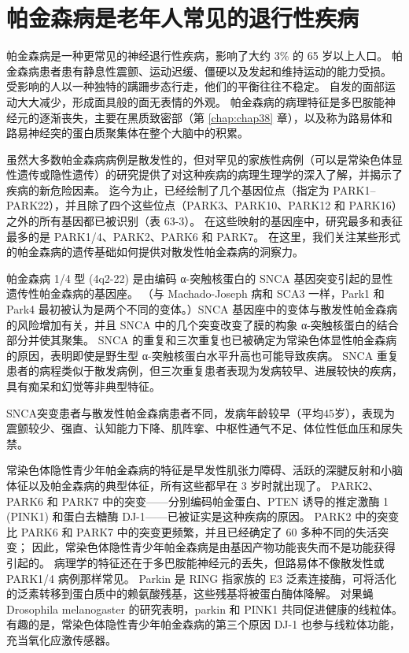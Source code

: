 \section{帕金森病是老年人常见的退行性疾病}

帕金森病是一种更常见的神经退行性疾病，影响了大约 3\% 的 65 岁以上人口。 帕金森病患者患有静息性震颤、运动迟缓、僵硬以及发起和维持运动的能力受损。 受影响的人以一种独特的蹒跚步态行走，他们的平衡往往不稳定。 自发的面部运动大大减少，形成面具般的面无表情的外观。 帕金森病的病理特征是多巴胺能神经元的逐渐丧失，主要在黑质致密部（第 \ref{chap:chap38} 章），以及称为路易体和路易神经突的蛋白质聚集体在整个大脑中的积累。

虽然大多数帕金森病病例是散发性的，但对罕见的家族性病例（可以是常染色体显性遗传或隐性遗传）的研究提供了对这种疾病的病理生理学的深入了解，并揭示了疾病的新危险因素。 迄今为止，已经绘制了几个基因位点（指定为 PARK1–PARK22），并且除了四个这些位点（PARK3、PARK10、PARK12 和 PARK16）之外的所有基因都已被识别（表 63-3）。 在这些映射的基因座中，研究最多和表征最多的是 PARK1/4、PARK2、PARK6 和 PARK7。 在这里，我们关注某些形式的帕金森病的遗传基础如何提供对散发性帕金森病的洞察力。

帕金森病 1/4 型 (4q2-22) 是由编码 α-突触核蛋白的 SNCA 基因突变引起的显性遗传性帕金森病的基因座。 （与 Machado-Joseph 病和 SCA3 一样，Park1 和 Park4 最初被认为是两个不同的变体。）SNCA 基因座中的变体与散发性帕金森病的风险增加有关，并且 SNCA 中的几个突变改变了膜的构象 α-突触核蛋白的结合部分并使其聚集。 SNCA 的重复和三次重复也已被确定为常染色体显性帕金森病的原因，表明即使是野生型 α-突触核蛋白水平升高也可能导致疾病。 SNCA 重复患者的病程类似于散发病例，但三次重复患者表现为发病较早、进展较快的疾病，具有痴呆和幻觉等非典型特征。

SNCA突变患者与散发性帕金森病患者不同，发病年龄较早（平均45岁），表现为震颤较少、强直、认知能力下降、肌阵挛、中枢性通气不足、体位性低血压和尿失禁。


常染色体隐性青少年帕金森病的特征是早发性肌张力障碍、活跃的深腱反射和小脑体征以及帕金森病的典型体征，所有这些都早在 3 岁时就出现了。 PARK2、PARK6 和 PARK7 中的突变——分别编码帕金蛋白、PTEN 诱导的推定激酶 1 (PINK1) 和蛋白去糖酶 DJ-1——已被证实是这种疾病的原因。 PARK2 中的突变比 PARK6 和 PARK7 中的突变更频繁，并且已经确定了 60 多种不同的失活突变； 因此，常染色体隐性青少年帕金森病是由基因产物功能丧失而不是功能获得引起的。 病理学的特征还在于多巴胺能神经元的丢失，但路易体不像散发性或 PARK1/4 病例那样常见。 Parkin 是 RING 指家族的 E3 泛素连接酶，可将活化的泛素转移到蛋白质中的赖氨酸残基，这些残基将被蛋白酶体降解。 对果蝇 Drosophila melanogaster 的研究表明，parkin 和 PINK1 共同促进健康的线粒体。 有趣的是，常染色体隐性青少年帕金森病的第三个原因 DJ-1 也参与线粒体功能，充当氧化应激传感器。


